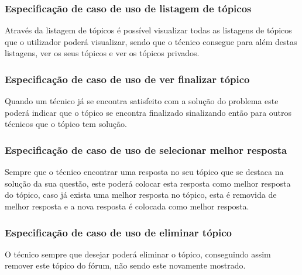 

\newpage

\subsubsection{Especificação de caso de uso de listagem de tópicos}

Através da listagem de tópicos é possível visualizar todas as listagens de tópicos que o utilizador poderá 
visualizar, sendo que o técnico consegue para além destas listagens, ver os seus tópicos e ver os tópicos 
privados.





\subsubsection{Especificação de caso de uso de ver finalizar tópico}

Quando um técnico já se encontra satisfeito com a solução do problema este poderá indicar que o tópico se 
encontra finalizado sinalizando então para outros técnicos que o tópico tem solução.



\newpage

\subsubsection{Especificação de caso de uso de selecionar melhor resposta}

Sempre que o técnico encontrar uma resposta no seu tópico que se destaca na solução da sua questão, 
este poderá colocar esta resposta como melhor resposta do tópico, caso já exista uma melhor resposta no 
tópico, esta é removida de melhor resposta e a nova resposta é colocada como melhor resposta.



\newpage

\subsubsection{Especificação de caso de uso de eliminar tópico}

O técnico sempre que desejar poderá eliminar o tópico, conseguindo assim remover este tópico do fórum, 
não sendo este novamente mostrado.

